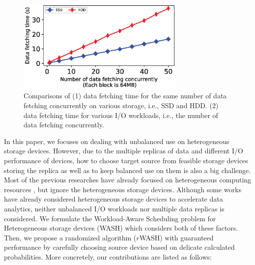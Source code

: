 \documentclass[conference]{IEEEtran}
\begin{document}
\begin{figure}[!t]
	\centering
	\includegraphics[height=1.8in]{fig_motivationnew4.eps}
	\caption{Comparisons of (1) data fetching time for the same number of data fetching concurrently on various storage, i.e., SSD and HDD. (2) data fetching time for various I/O workloads, i.e., the number of data fetching concurrently.}
	\label{Fig:motivation}

\end{figure} 

 
In this paper, we focuses on dealing with unbalanced use on heterogeneous storage devices. 
However, due to the multiple replicas of data and different I/O performance of devices, how to choose target source from feasible storage devices storing the replica as well as to keep balanced use on them is also a big challenge.
Most of the previous researches have already focused on heterogeneous computing resources \cite{b25}\cite{b26}\cite{b35}\cite{b36}, but ignore the heterogeneous storage devices. 
Although some works \cite{b6}\cite{b7} have already considered heterogeneous storage devices to accelerate data analytics, neither unbalanced I/O workloads nor multiple data replicas is considered. 
We formulate the Workload-Aware Scheduling problem for Heterogeneous storage devices (WASH) which considers both of these factors. 
Then, we propose a randomized algorithm ($r$WASH) with guaranteed performance by carefully choosing source device based on delicate calculated probabilities.
More concretely, our contributions are listed as follows: 
\end{document}
